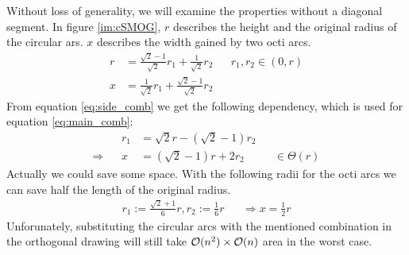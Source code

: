 Without loss of generality, we will examine the properties without a diagonal segment. In figure \ref{im:cSMOG}, $r$ describes the height and the original radius of the circular ars. $x$ describes the width gained by two octi arcs.
\begin{align}
r &= \frac{\sqrt{2}-1}{\sqrt{2}}r_1 + \frac{1}{\sqrt{2}}r_2\label{eq:side_comb}&&r_1,r_2 \in (0,r)\\
x &= \frac{1}{\sqrt{2}}r_1 + \frac{\sqrt{2}-1}{\sqrt{2}}r_2\label{eq:main_comb}
\end{align}
From equation \ref{eq:side_comb} we get the following dependency, which is used for equation \ref{eq:main_comb}:
\begin{align*}
&&	r_1 &= \sqrt{2}r - \left(\sqrt{2}-1\right)r_2 &&\\
\Rightarrow &&	x &= \left(\sqrt{2}-1\right)r+2r_2 &&\in \Theta(r)
\end{align*}
Actually we could save some space. With the following radii for the octi arcs we can save half the length of the original radius.
\begin{align}
r_1 := \frac{\sqrt{2}+1}{6}r, r_2:=\frac{1}{6}r &&\Rightarrow x = \frac{1}{2}r
\end{align}
Unforunately, substituting the circular arcs with the mentioned combination in the orthogonal drawing will still take $\mathcal{O}(n^2)\times\mathcal{O}(n)$ area in the worst case.